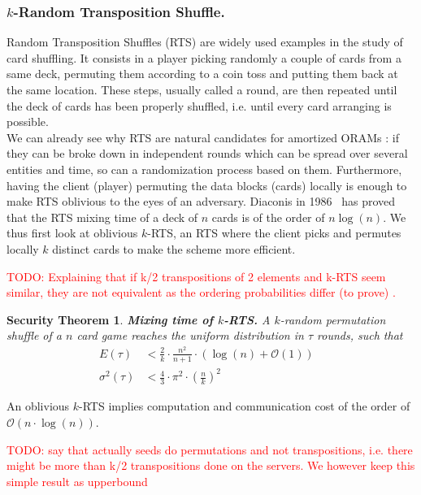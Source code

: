 \documentclass{llncs}
\newtheorem{secthm}{Security Theorem}
\newcommand{\todo}[1]{\textcolor{red}{TODO: #1}}
\begin{document}
\subsubsection{$k$-Random Transposition Shuffle.}
Random Transposition Shuffles (RTS) are widely used examples in the study of card shuffling. It consists in a player picking randomly a couple of cards from a same deck, permuting them according to a coin toss and putting them back at the same location.
These steps, usually called a round, are then repeated until the deck of cards has been properly shuffled, i.e. until every card arranging is possible.\\
We can already see why RTS are natural candidates for amortized ORAMs : if they can be broke down in independent rounds which can be spread over several entities and time, so can a randomization process based on them. Furthermore, having the client (player) permuting the data blocks (cards) locally is enough to make RTS oblivious to the eyes of an adversary.
Diaconis in 1986~\cite{aldous1986shuffling} has proved that the RTS mixing time of a deck of $n$ cards is of the order of $n\log(n)$. We thus first look at oblivious $k$-RTS, an RTS where the client picks and permutes locally $k$ distinct cards to make the scheme more efficient. 

\todo{Explaining that if k/2 transpositions of 2 elements and k-RTS seem similar, they are not equivalent as the ordering probabilities differ (to prove) .}

\begin{secthm}
\textbf{Mixing time of $k$-RTS.} A $k$-random permutation shuffle of a $n$ card game reaches the uniform distribution in $\tau$ rounds, such that
\begin{align*}
E(\tau) &< \frac{2}{k}\cdot\frac{n^2}{n+1}\cdot \left ( \log(n) + \mathcal{O}(1) \right ) &\\
\sigma^2(\tau) &< \frac{4}{3} \cdot {\pi}^2 \cdot \left ( \frac{n}{k} \right )^2 &
\end{align*}
\end{secthm}

An oblivious $k$-RTS implies computation and communication cost of the order of $\mathcal{O} \left(n\cdot \log(n)\right)$.

\todo{say that actually seeds do permutations and not transpositions, i.e. there might be more than k/2 transpositions done on the servers. We however keep this simple result as upperbound}
%
\end{document}
